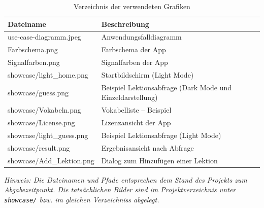 \documentclass[12pt,a4paper]{article}
\begin{document}
\begin{table}[htbp]
\centering
\caption{Verzeichnis der verwendeten Grafiken}
\begin{tabularx}{\textwidth}{ll}
\toprule
\textbf{Dateiname} & \textbf{Beschreibung} \\
\midrule
use-case-diagramm.jpeg & Anwendungsfalldiagramm \\
Farbschema.png & Farbschema der App \\
Signalfarben.png & Signalfarben der App \\
showcase/light\_home.png & Startbildschirm (Light Mode) \\
showcase/guess.png & Beispiel Lektionsabfrage (Dark Mode und Einzeldarstellung) \\
showcase/Vokabeln.png & Vokabelliste – Beispiel \\
showcase/License.png & Lizenzansicht der App \\
showcase/light\_guess.png & Beispiel Lektionsabfrage (Light Mode) \\
showcase/result.png & Ergebnisansicht nach Abfrage \\
showcase/Add\_Lektion.png & Dialog zum Hinzufügen einer Lektion \\
\bottomrule
\end{tabularx}
\end{table}

\textit{Hinweis: Die Dateinamen und Pfade entsprechen dem Stand des Projekts zum Abgabezeitpunkt. Die tatsächlichen Bilder sind im Projektverzeichnis unter \texttt{showcase/} bzw. im gleichen Verzeichniss abgelegt.}
\end{document}
